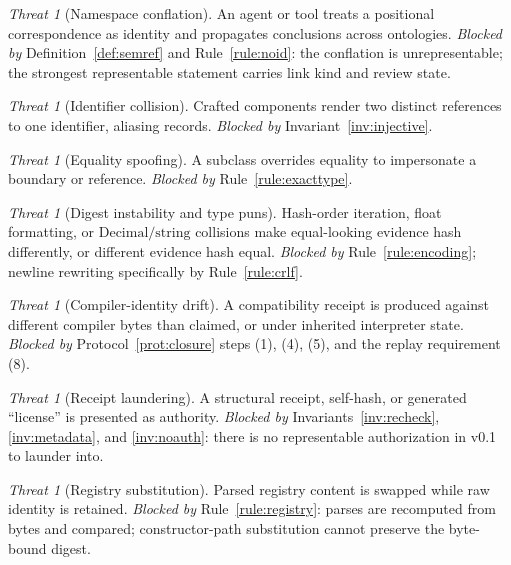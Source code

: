 \documentclass[11pt]{amsart}
\theoremstyle{definition}
\theoremstyle{remark}
\newtheorem{threat}[theorem]{Threat}
\begin{document}
\begin{threat}[Namespace conflation]
An agent or tool treats a positional correspondence as identity and propagates conclusions across ontologies. \emph{Blocked by} Definition~\ref{def:semref} and Rule~\ref{rule:noid}: the conflation is unrepresentable; the strongest representable statement carries link kind and review state.
\end{threat}

\begin{threat}[Identifier collision]
Crafted components render two distinct references to one identifier, aliasing records. \emph{Blocked by} Invariant~\ref{inv:injective}.
\end{threat}

\begin{threat}[Equality spoofing]
A subclass overrides equality to impersonate a boundary or reference. \emph{Blocked by} Rule~\ref{rule:exacttype}.
\end{threat}

\begin{threat}[Digest instability and type puns]
Hash-order iteration, float formatting, or $\mathrm{Decimal}/\text{string}$ collisions make equal-looking evidence hash differently, or different evidence hash equal. \emph{Blocked by} Rule~\ref{rule:encoding}; newline rewriting specifically by Rule~\ref{rule:crlf}.
\end{threat}

\begin{threat}[Compiler-identity drift]
A compatibility receipt is produced against different compiler bytes than claimed, or under inherited interpreter state. \emph{Blocked by} Protocol~\ref{prot:closure} steps (1), (4), (5), and the replay requirement (8).
\end{threat}

\begin{threat}[Receipt laundering]
A structural receipt, self-hash, or generated ``license'' is presented as authority. \emph{Blocked by} Invariants~\ref{inv:recheck}, \ref{inv:metadata}, and \ref{inv:noauth}: there is no representable authorization in v0.1 to launder into.
\end{threat}

\begin{threat}[Registry substitution]
Parsed registry content is swapped while raw identity is retained. \emph{Blocked by} Rule~\ref{rule:registry}: parses are recomputed from bytes and compared; constructor-path substitution cannot preserve the byte-bound digest.
\end{threat}
\end{document}

